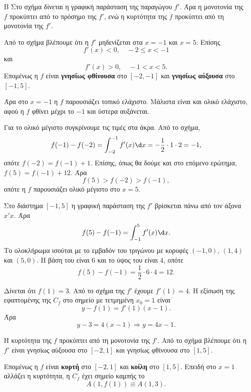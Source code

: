 

\begin{thema}{Β}
Στο σχήμα δίνεται η γραφική παράσταση της παραγώγου $f'$. Άρα η μονοτονία της $f$ προκύπτει από το πρόσημο της $f'$, ενώ η κυρτότητα της $f$ προκύπτει από τη μονοτονία της $f'$.

\begin{erwthma}
\item Από το σχήμα βλέπουμε ότι η $f'$ μηδενίζεται στα $x=-1$ και $x=5$. Επίσης
\[
f'(x)<0,\quad -2\leq x<-1
\]
και
\[
f'(x)>0,\quad -1<x<5.
\]
Επομένως η $f$ είναι \textbf{γνησίως φθίνουσα} στο $[-2,-1]$ και \textbf{γνησίως αύξουσα} στο $[-1,5]$.

Άρα στο $x=-1$ η $f$ παρουσιάζει τοπικό ελάχιστο. Μάλιστα είναι και ολικό ελάχιστο, αφού η $f$ φθίνει μέχρι το $-1$ και ύστερα αυξάνεται.

Για το ολικό μέγιστο συγκρίνουμε τις τιμές στα άκρα. Από το σχήμα,
\[
f(-1)-f(-2)=\int_{-2}^{-1}f'(x)\d x=-\frac{1}{2}\cdot 1\cdot 2=-1,
\]
οπότε $f(-2)=f(-1)+1$. Επίσης, όπως θα δούμε και στο επόμενο ερώτημα, $f(5)=f(-1)+12$. Άρα
\[
f(5)>f(-2)>f(-1),
\]
οπότε η $f$ παρουσιάζει ολικό μέγιστο στο $x=5$.

\item Στο διάστημα $[-1,5]$ η γραφική παράσταση της $f'$ βρίσκεται πάνω από τον άξονα $x'x$. Άρα
\[
f(5)-f(-1)=\int_{-1}^{5}f'(x)\d x.
\]
Το ολοκλήρωμα ισούται με το εμβαδόν του τριγώνου με κορυφές $(-1,0)$, $(1,4)$ και $(5,0)$. Η βάση του είναι $6$ και το ύψος του είναι $4$, οπότε
\[
f(5)-f(-1)=\frac{1}{2}\cdot 6\cdot 4=12.
\]

\item Δίνεται ότι $f(1)=3$. Από το σχήμα της $f'$ έχουμε $f'(1)=4$. Η εξίσωση της εφαπτομένης της $C_f$ στο σημείο με τετμημένη $x_0=1$ είναι
\[
y-f(1)=f'(1)(x-1).
\]
Άρα
\[
y-3=4(x-1)\Rightarrow y=4x-1.
\]

\item Η κυρτότητα της $f$ προκύπτει από τη μονοτονία της $f'$. Από το σχήμα βλέπουμε ότι η $f'$ είναι γνησίως αύξουσα στο $[-2,1]$ και γνησίως φθίνουσα στο $[1,5]$.

Επομένως η $f$ είναι \textbf{κυρτή} στο $[-2,1]$ και \textbf{κοίλη} στο $[1,5]$. Επειδή στο $x=1$ αλλάζει η κυρτότητα, η $C_f$ έχει σημείο καμπής το
\[
A(1,f(1))\equiv A(1,3).
\]
\end{erwthma}
\end{thema}

